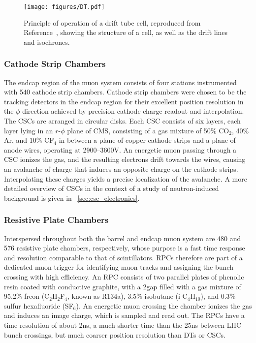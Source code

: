 \begin{figure}[tpb]
  \centering
  \texttt{[image: figures/DT.pdf]}
  \caption{Principle of operation of a drift tube cell, reproduced from Reference~\cite{Chatrchyan:2013sba}, showing the structure of a cell, as well as the drift lines and isochrones.}
  \label{cms:dt}
\end{figure}

\subsubsection{Cathode Strip Chambers}
The endcap region of the muon system consists of four stations instrumented with 540 cathode strip chambers.
Cathode strip chambers were chosen to be the tracking detectors in the endcap region for their excellent position resolution in the $\phi$ direction achieved by precision cathode charge readout and interpolation.
The CSCs are arranged in circular disks.
Each CSC consists of six layers, each layer lying in an $r$-$\phi$ plane of CMS, consisting of a gas mixture of 50\% CO$_2$, 40\% Ar, and 10\% CF$_4$ in between a plane of copper cathode strips and a plane of anode wires, operating at 2900--3600\unit{V}.
An energetic muon passing through a CSC ionizes the gas, and the resulting electrons drift towards the wires, causing an avalanche of charge that induces an opposite charge on the cathode strips.
Interpolating these charges yields a precise localization of the avalanche.
A more detailed overview of CSCs in the context of a study of neutron-induced background is given in \Sec~\ref{sec:csc_electronics}.

\subsubsection{Resistive Plate Chambers}
Interspersed throughout both the barrel and endcap muon system are 480 and 576 resistive plate chambers, respectively, whose purpose is a fast time response and resolution comparable to that of scintillators.
RPCs therefore are part of a dedicated muon trigger for identifying muon tracks and assigning the bunch crossing with high efficiency.
An RPC consists of two parallel plates of phenolic resin coated with conductive graphite, with a 2\mm gap filled with a gas mixture of 95.2\% freon (C$_2$H$_2$F$_4$, known as R134a), 3.5\% isobutane (i-C$_4$H$_{10}$), and 0.3\% sulfur hexafluoride (SF$_6$).
An energetic muon crossing the chamber ionizes the gas and induces an image charge, which is sampled and read out.
The RPCs have a time resolution of about 2\unit{ns}, a much shorter time than the 25\unit{ns} between LHC bunch crossings, but much coarser position resolution than DTs or CSCs.

